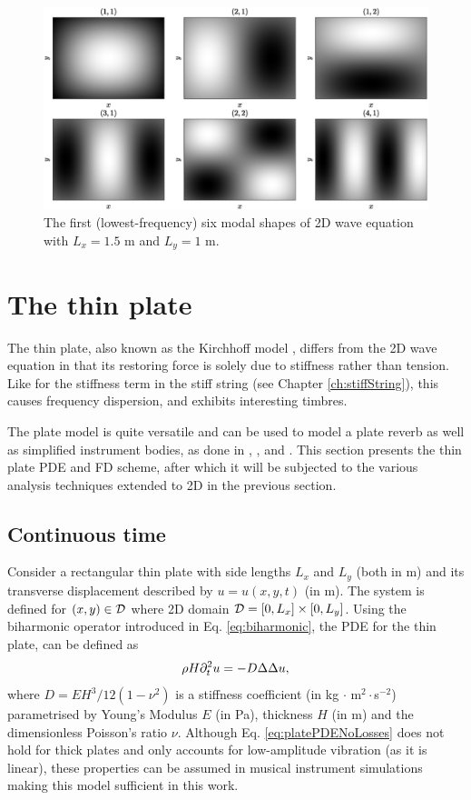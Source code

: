 \begin{figure}[h]
    \centering
    \includegraphics[width=\textwidth]{figures/resonators/2d/modalShapes.eps}
    \caption{The first (lowest-frequency) six modal shapes of 2D wave equation with $L_x = 1.5$ m and $L_y = 1$ m.%
    \label{fig:modalShapes2D}}
\end{figure}

\section{The thin plate}\label{sec:thinPlate}
The thin plate, also known as the Kirchhoff model \cite{Kirchhoff1968}, differs from the 2D wave equation in that its restoring force is solely due to stiffness rather than tension. Like for the stiffness term in the stiff string (see Chapter \ref{ch:stiffString}), this causes frequency dispersion, and exhibits interesting timbres. 

The plate model is quite versatile and can be used to model a plate reverb \cite{DAFxChapter} as well as simplified instrument bodies, as done in \citeP[A], \citeP[B], \citeP[D] and \citeP[E]. This section presents the thin plate PDE and FD scheme, after which it will be subjected to the various analysis techniques extended to 2D in the previous section.

\subsection{Continuous time}
Consider a rectangular thin plate with side lengths $L_x$ and $L_y$ (both in m) and its transverse displacement described by $u=u(x,y,t)$ (in m). The system is defined for $(x,y)\in \mathcal{D}$ where 2D domain $\mathcal{D} = [0, L_x]\times [0, L_y]$. Using the biharmonic operator introduced in Eq. \eqref{eq:biharmonic}, the PDE for the thin plate, can be defined as \cite{Kirchhoff1968}
\begin{equation}\label{eq:platePDENoLosses}
    \rho H \partial_t^2 u = -D\Delta\Delta u,
\end{equation}
where $D = EH^3/12(1-\nu^2)$ is a stiffness coefficient (in kg $\cdot$ m$^2\cdot$s$^{-2}$) parametrised by Young's Modulus $E$ (in Pa), thickness $H$ (in m) and the dimensionless Poisson's ratio $\nu$. Although Eq. \eqref{eq:platePDENoLosses} does not hold for thick plates and only accounts for low-amplitude vibration (as it is linear), these properties can be assumed in musical instrument simulations making this model sufficient in this work. 

